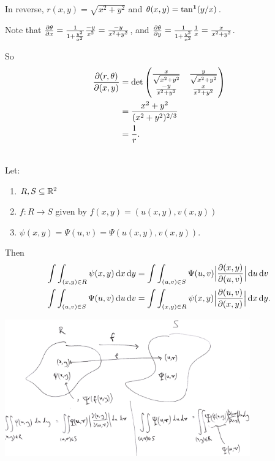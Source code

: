 \begin{example*}
  In reverse, $r(x,y) = \sqrt{x^2 + y^2}$ and $\theta(x,y) = \tan^{\mathbf 1}(y/x)$.

  Note that $\frac{\partial \theta}{\partial x} = \frac{1}{1 + \frac{y^2}{x^2}}\frac{-y}{x^2} = \frac{-y}{x^2 + y^2}$,
  and $\frac{\partial \theta}{\partial y} = \frac{1}{1 + \frac{y^2}{x^2}}\frac{1}{x} = \frac{x}{x^2 + y^2}$.

  So
  \begin{align*}
    \frac{\partial(r, \theta)}{\partial(x, y)}
    &= \det \begin{pmatrix}\frac{x}{\sqrt{x^2 + y^2}} & \frac{y}{\sqrt{x^2 + y^2}}\\\frac{-y}{x^2 + y^2}       & \frac{x}{x^2 + y^2}\\ \end{pmatrix}\\
    &= \frac{x^2 + y^2}{(x^2+y^2)^{2/3}}\\
    &= \frac{1}{r}.
  \end{align*}
\end{example*}

\begin{theorem*}~\\
  Let:
  \begin{enumerate}
  \item $R, S \subseteq \mathbb{R}^2$
  \item $f:R \to S$ given by $f(x,y) = (u(x,y), v(x,y))$
  \item $\psi(x, y) = \Psi(u, v) = \Psi(u(x,y), v(x, y))$.
  \end{enumerate}
  Then
  \begin{align*}
    \int\int_{(x,y) \in R} \psi(x,y)\dx \dy
    &= \int\int_{(u, v) \in S} \Psi(u, v)\Big|\frac{\partial(x, y)}{\partial(u, v)}\Big|\du \d v\\
    \int\int_{(u,v) \in S} \Psi(u,v)\du \d v
    &= \int\int_{(x, y) \in R} \psi(x, y)\Big|\frac{\partial(u, v)}{\partial(x, y)}\Big|\dx \dy.
  \end{align*}
\end{theorem*}

\begin{mdframed}
  \includegraphics[width=300pt]{img/calculus-jacobian-2D-map.png}
\end{mdframed}

